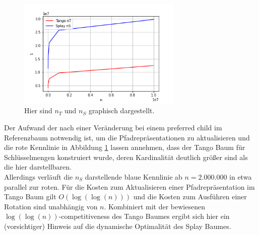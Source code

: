\documentclass[a4paper,12pt]{article}
\begin{document}
\begin{figure}[H]
	\centering
	\includegraphics[width=0.7\textwidth]{Medien/laufzeittest/diagramm/nT}
	\caption{Hier sind $n_T$ und $n_S$ graphisch dargestellt.}
	\label{fig:nT}
\end{figure}
\noindent Der Aufwand der nach einer Veränderung bei einem preferred child im Referenzbaum notwendig ist, um die Pfadrepräsentationen zu aktualisieren und die rote Kennlinie in Abbildung \ref{fig:nT} lassen annehmen, dass der Tango Baum für Schlüsselmengen konstruiert wurde, deren Kardinalität deutlich größer sind als die hier darstellbaren. \\
 Allerdings verläuft die $n_S$ darstellende blaue Kennlinie ab $n = 2.000.000$ in etwa parallel zur roten. Für die Kosten zum  Aktualisieren einer Pfadrepräsentation im Tango Baum gilt $O\left(\log\left(\log\left(n\right)\right)\right)$ und die Kosten zum Ausführen einer Rotation sind unabhängig von $n$. Kombiniert mit der bewiesenen $\log\left(\log\left(n\right)\right)$-competitiveness des Tango Baumes ergibt sich hier ein (vorsichtiger) Hinweis auf die dynamische Optimalität des Splay Baumes.
\end{document}
